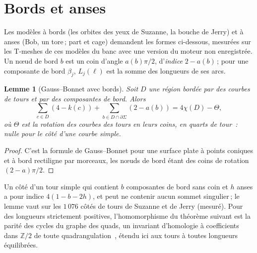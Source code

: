 \documentclass[11pt,a4paper]{article}
\newtheorem{lemma}{Lemme}
\newcommand{\Z}{\mathbb{Z}}
\begin{document}
\section{Bords et anses}\label{sec:beyond}

Les modèles à bords (les orbites des yeux de Suzanne, la bouche de Jerry) et à
anses (Bob, un tore\,; part et cage) demandent les formes ci-dessous, mesurées
sur les T-meshes de ces modèles du banc avec une version du moteur non
enregistrée. Un nœud de bord $b$ est un coin d'angle $a(b)\pi/2$,
d'\emph{indice} $2 - a(b)$\,; pour une composante de bord $\beta_j$,
$L_j(\ell)$ est la somme des longueurs de ses arcs.

\begin{lemma}[Gauss--Bonnet avec bords]\label{lem:gauss-border}
Soit $D$ une région bordée par des courbes de tours et par des composantes de
bord. Alors
\[
  \sum_{c \in D} (4 - k(c)) + \sum_{b \in D \cap \partial\Sigma} (2 - a(b))
  = 4\chi(D) - \Theta,
\]
où $\Theta$ est la rotation des courbes des tours en leurs coins, en quarts de
tour~: nulle pour le côté d'une courbe simple.
\end{lemma}
\begin{proof}
C'est la formule de Gauss--Bonnet pour une surface plate à points coniques et
à bord rectiligne par morceaux, les nœuds de bord étant des coins de rotation
$(2 - a)\pi/2$.
\end{proof}

Un côté d'un tour simple qui contient $b$ composantes de bord sans coin et $h$
anses a pour indice $4(1 - b - 2h)$, et peut ne contenir aucun sommet
singulier\,; le lemme vaut sur les $1\,076$ côtés de tours de Suzanne et de
Jerry (mesuré). Pour des longueurs strictement positives, l'homomorphisme du
théorème suivant est la parité des cycles du graphe des quads, un invariant
d'homologie à coefficients dans $\Z/2$ de toute
quadrangulation~\cite[lemme~3.1]{kaiser2015colouring}, étendu ici aux tours à
toutes longueurs équilibrées.
\end{document}
